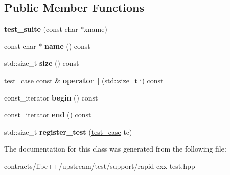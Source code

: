 \subsection*{Public Member Functions}
\begin{DoxyCompactItemize}
\item 
\mbox{\label{classrapid__cxx__test_1_1test__suite_afa700cc57bf4a216647cfb67333ecb4d}} 
{\bfseries test\+\_\+suite} (const char $\ast$xname)
\item 
\mbox{\label{classrapid__cxx__test_1_1test__suite_ae72f2d6418b1994f9f001d936c58c439}} 
const char $\ast$ {\bfseries name} () const
\item 
\mbox{\label{classrapid__cxx__test_1_1test__suite_ab205820ae1515137dd127a62ed3c130f}} 
std\+::size\+\_\+t {\bfseries size} () const
\item 
\mbox{\label{classrapid__cxx__test_1_1test__suite_a504e800726335e9a68f76d0484147c64}} 
\mbox{\hyperlink{structrapid__cxx__test_1_1test__case}{test\+\_\+case}} const  \& {\bfseries operator\mbox{[}$\,$\mbox{]}} (std\+::size\+\_\+t i) const
\item 
\mbox{\label{classrapid__cxx__test_1_1test__suite_aa3b91ec0beddd42e43d202c6b5828a45}} 
const\+\_\+iterator {\bfseries begin} () const
\item 
\mbox{\label{classrapid__cxx__test_1_1test__suite_a3b4a174dff558a0e2c1fbba72c1a0947}} 
const\+\_\+iterator {\bfseries end} () const
\item 
\mbox{\label{classrapid__cxx__test_1_1test__suite_a4542a1d1be97048101dc1cd0229c9562}} 
std\+::size\+\_\+t {\bfseries register\+\_\+test} (\mbox{\hyperlink{structrapid__cxx__test_1_1test__case}{test\+\_\+case}} tc)
\end{DoxyCompactItemize}


The documentation for this class was generated from the following file\+:\begin{DoxyCompactItemize}
\item 
contracts/libc++/upstream/test/support/rapid-\/cxx-\/test.\+hpp\end{DoxyCompactItemize}
